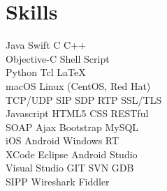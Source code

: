 \documentclass[a4paper]{lyu-resume} %
\begin{document}
\begin{minipage}[t]{0.33\textwidth} %


\section{Skills}

Java \textbullet{} Swift \textbullet{} C \textbullet{} C++\\
Objective-C \textbullet{} Shell Script \\
Python \textbullet{} Tcl \textbullet{} \LaTeX\\
macOS \textbullet{} Linux (CentOS, Red Hat)\\
TCP/UDP \textbullet{} SIP \textbullet{} SDP \textbullet{} RTP \textbullet{} SSL/TLS\\
Javascript \textbullet{} HTML5 \textbullet{} CSS \textbullet{} RESTful \\
SOAP \textbullet{} Ajax \textbullet{} Bootstrap \textbullet{} MySQL \\ 
iOS \textbullet{} Android \textbullet{} Windows RT \\
XCode \textbullet{} Eclipse \textbullet{} Android Studio\\
Visual Studio \textbullet{} GIT \textbullet{} SVN \textbullet{} GDB\\
SIPP \textbullet{} Wireshark \textbullet{} Fiddler
\sectionspace %







\end{minipage}
\end{document}

